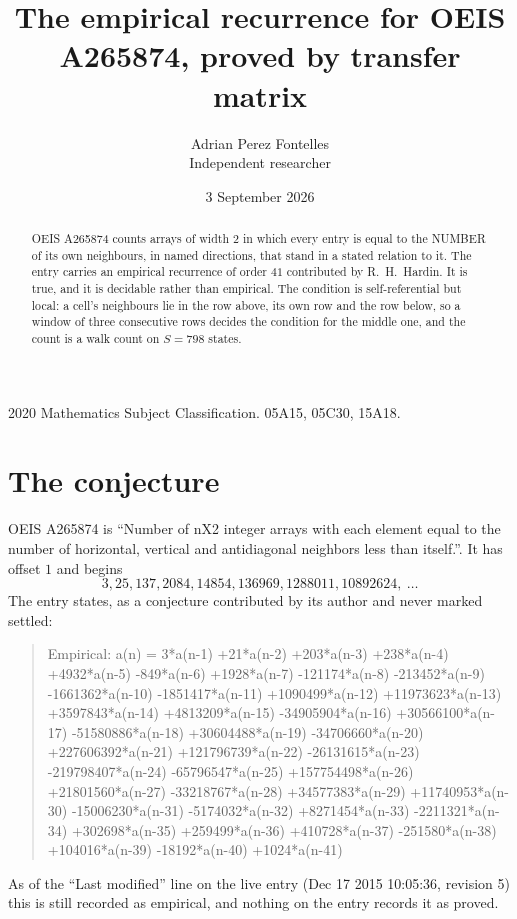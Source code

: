 \documentclass[11pt,a4paper]{article}
\title{The empirical recurrence for OEIS A265874, proved by transfer matrix}
\author{Adrian Perez Fontelles\\ \small Independent researcher}
\date{3 September 2026}
\theoremstyle{plain}
\theoremstyle{definition}
\begin{document}
\maketitle

\begin{abstract}
OEIS A265874 counts arrays of width $2$ in which every entry is equal to the NUMBER of its own
neighbours, in named directions, that stand in a stated relation to it. The entry carries an
empirical recurrence of order $41$ contributed by R.~H.~Hardin. It is true, and it is
decidable rather than empirical. The condition is self-referential but local: a cell's
neighbours lie in the row above, its own row and the row below, so a window of three
consecutive rows decides the condition for the middle one, and the count is a walk count on
$S=798$ states.
\end{abstract}

\noindent\small 2020 Mathematics Subject Classification. 05A15, 05C30, 15A18.\normalsize

\section{The conjecture}

OEIS A265874 is ``Number of nX2 integer arrays with each element equal to the number of horizontal, vertical and antidiagonal neighbors less than itself.''. It has offset $1$ and begins
\[
3, 25, 137, 2084, 14854, 136969, 1288011, 10892624,\ \dots
\]
The entry states, as a conjecture contributed by its author and never marked settled:
\begin{quote}
Empirical: a(n) = 3*a(n-1) +21*a(n-2) +203*a(n-3) +238*a(n-4) +4932*a(n-5) -849*a(n-6) +1928*a(n-7) -121174*a(n-8) -213452*a(n-9) -1661362*a(n-10) -1851417*a(n-11) +1090499*a(n-12) +11973623*a(n-13) +3597843*a(n-14) +4813209*a(n-15) -34905904*a(n-16) +30566100*a(n-17) -51580886*a(n-18) +30604488*a(n-19) -34706660*a(n-20) +227606392*a(n-21) +121796739*a(n-22) -26131615*a(n-23) -219798407*a(n-24) -65796547*a(n-25) +157754498*a(n-26) +21801560*a(n-27) -33218767*a(n-28) +34577383*a(n-29) +11740953*a(n-30) -15006230*a(n-31) -5174032*a(n-32) +8271454*a(n-33) -2211321*a(n-34) +302698*a(n-35) +259499*a(n-36) +410728*a(n-37) -251580*a(n-38) +104016*a(n-39) -18192*a(n-40) +1024*a(n-41)
\end{quote}
As of the ``Last modified'' line on the live entry (Dec 17 2015 10:05:36, revision 5) this is still
recorded as empirical, and nothing on the entry records it as proved.
\end{document}
